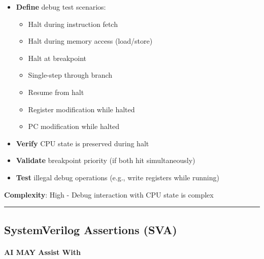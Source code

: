 \begin{record}

\begin{itemize}
\tightlist
\item
  \textbf{Define} debug test scenarios:

  \begin{itemize}
  \tightlist
  \item
    Halt during instruction fetch
  \item
    Halt during memory access (load/\allowbreak{}store)
  \item
    Halt at breakpoint
  \item
    Single-step through branch
  \item
    Resume from halt
  \item
    Register modification while halted
  \item
    PC modification while halted
  \end{itemize}
\item
  \textbf{Verify} CPU state is preserved during halt
\item
  \textbf{Validate} breakpoint priority (if both hit simultaneously)
\item
  \textbf{Test} illegal debug operations (e.g., write registers while
  running)
\end{itemize}

\textbf{Complexity}: \bad{} High - Debug interaction with CPU state is
complex

\begin{center}\rule{0.5\linewidth}{0.5pt}\end{center}

\end{record}

\subsection{SystemVerilog Assertions (SVA)}\label{cr:status:phase1-ai-human-responsibilities:systemverilog-assertions-sva}

\paragraph{\texorpdfstring{\ok{} AI MAY Assist
With}{ AI MAY Assist With}}\label{cr:status:phase1-ai-human-responsibilities:white-check-mark-ai-may-assist-with-16}

